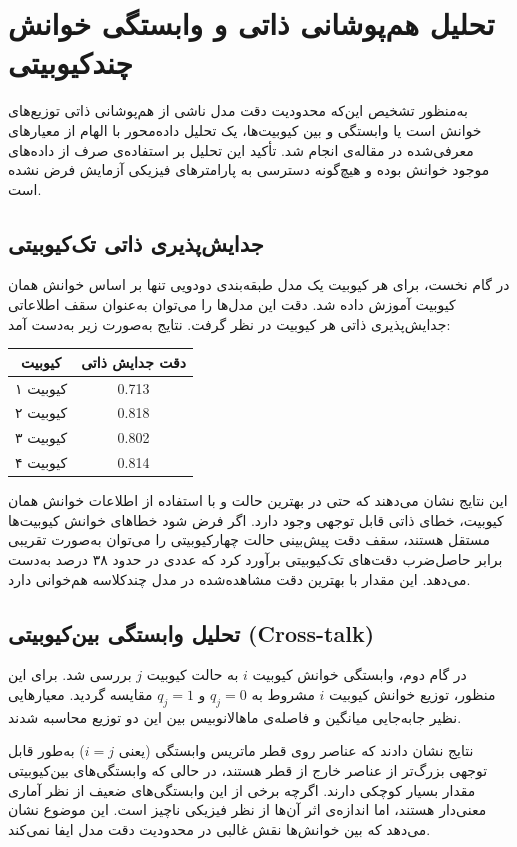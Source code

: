 \section{تحلیل هم‌پوشانی ذاتی و وابستگی خوانش چندکیوبیتی}
به‌منظور تشخیص این‌که محدودیت دقت مدل ناشی از هم‌پوشانی ذاتی توزیع‌های خوانش است یا وابستگی و  بین کیوبیت‌ها، یک تحلیل داده‌محور با الهام از معیارهای معرفی‌شده در مقاله‌ی
انجام شد. تأکید این تحلیل بر استفاده‌ی صرف از داده‌های موجود خوانش بوده و هیچ‌گونه دسترسی به پارامترهای فیزیکی آزمایش فرض نشده است.

\subsection{جدایش‌پذیری ذاتی تک‌کیوبیتی}
در گام نخست، برای هر کیوبیت یک مدل طبقه‌بندی دودویی تنها بر اساس خوانش همان کیوبیت آموزش داده شد. دقت این مدل‌ها را می‌توان به‌عنوان سقف اطلاعاتی جدایش‌پذیری ذاتی هر کیوبیت در نظر گرفت. نتایج به‌صورت زیر به‌دست آمد:
\begin{center}
	\begin{tabular}{c c}
		\hline
		کیوبیت & دقت جدایش ذاتی \\
		\hline
		کیوبیت ۱ & 0.713 \\
		کیوبیت ۲ & 0.818 \\
		کیوبیت ۳ & 0.802 \\
		کیوبیت ۴ & 0.814 \\
		\hline
	\end{tabular}
\end{center}

این نتایج نشان می‌دهند که حتی در بهترین حالت و با استفاده از اطلاعات خوانش همان کیوبیت، خطای ذاتی قابل توجهی وجود دارد. اگر فرض شود خطاهای خوانش کیوبیت‌ها مستقل هستند، سقف دقت پیش‌بینی حالت چهارکیوبیتی را می‌توان به‌صورت تقریبی برابر حاصل‌ضرب دقت‌های تک‌کیوبیتی برآورد کرد که عددی در حدود ۳۸ درصد به‌دست می‌دهد. این مقدار با بهترین دقت مشاهده‌شده در مدل چندکلاسه هم‌خوانی دارد.

\subsection{تحلیل وابستگی بین‌کیوبیتی (Cross-talk)}
در گام دوم، وابستگی خوانش کیوبیت $i$ به حالت کیوبیت $j$ بررسی شد. برای این منظور، توزیع خوانش کیوبیت $i$ مشروط به $q_j=0$ و $q_j=1$ مقایسه گردید. معیارهایی نظیر جابه‌جایی میانگین و فاصله‌ی ماهالانوبیس بین این دو توزیع محاسبه شدند.

نتایج نشان دادند که عناصر روی قطر ماتریس وابستگی (یعنی $i=j$) به‌طور قابل توجهی بزرگ‌تر از عناصر خارج از قطر هستند، در حالی که وابستگی‌های بین‌کیوبیتی مقدار بسیار کوچکی دارند. اگرچه برخی از این وابستگی‌های ضعیف از نظر آماری معنی‌دار هستند، اما اندازه‌ی اثر آن‌ها از نظر فیزیکی ناچیز است. این موضوع نشان می‌دهد که  بین خوانش‌ها نقش غالبی در محدودیت دقت مدل ایفا نمی‌کند.

